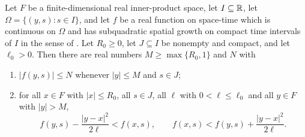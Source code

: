 \begin{lemma}
Let $F$ be a finite-dimensional real inner-product space, let $I\subseteq\mathbb{R}$, let
$\Omega=\{(y,s):s\in I\}$, and let $f$ be a real function on space-time which is
continuous on $\Omega$ and has subquadratic spatial growth on compact time
intervals of $I$ in the sense of . Let $R_0\ge0$, let
$J\subseteq I$ be nonempty and compact, and let $\ell_0>0$. Then there are real
numbers $M\ge\max\{R_0,1\}$ and $N$ with
\begin{enumerate}
\item[(i)] $|f(y,s)|\le N$ whenever $|y|\le M$ and $s\in J$;
\item[(ii)] for all $x\in F$ with $|x|\le R_0$, all $s\in J$, all $\ell$ with
$0<\ell\le\ell_0$ and all $y\in F$ with $|y|>M$,
\[
  f(y,s)-\frac{|y-x|^2}{2\ell}<f(x,s),
  \qquad
  f(x,s)<f(y,s)+\frac{|y-x|^2}{2\ell}.
\]
\end{enumerate}
\end{lemma}
